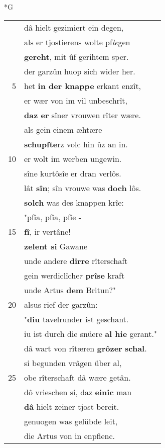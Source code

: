 \documentclass[8pt,a4paper,notitlepage]{article}
\begin{document}
\begin{table}[ht]
\begin{minipage}[t]{0.5\linewidth}
\small
\begin{center}*G
\end{center}
\begin{tabular}{rl}
 & dâ hielt gezimiert ein degen,\\ 
 & als er tjostierens wolte pf\textit{le}gen\\ 
 & \textbf{gereht}, mit ûf gerihtem sper.\\ 
 & der garzûn huop sich wider her.\\ 
5 & het \textbf{in der knappe} erkant enzît,\\ 
 & er wær von im vil unbeschrît,\\ 
 & \textbf{daz er} sîner vrouwen rîter wære.\\ 
 & als gein einem æhtære\\ 
 & \textbf{schupfte}rz volc hin ûz an in.\\ 
10 & er wolt im werben ungewin.\\ 
 & sîne kurtôsîe er dran verlôs.\\ 
 & lât \textbf{sîn}; sîn vrouwe was \textbf{doch} lôs.\\ 
 & \textbf{solch} was des knappen krîe:\\ 
 & "pfîa, pfîa, pfîe -\\ 
15 & \textbf{fî}, ir vertâne!\\ 
 & \textbf{zelent si} Gawane\\ 
 & unde andere \textbf{dirre} rîterschaft\\ 
 & gein werdiclîche\textit{r} \textbf{prîse} kraft\\ 
 & unde Artus \textbf{dem} Britun?"\\ 
20 & alsus rief der garzûn:\\ 
 & "\textbf{diu} tavelrunder ist geschant.\\ 
 & iu ist durch die snüere \textbf{al hie} gerant."\\ 
 & dâ wart von rîtæren \textbf{grôzer} \textbf{schal}.\\ 
 & si begunden vrâgen über al,\\ 
25 & obe rîterschaft dâ wære getân.\\ 
 & dô vrieschen si, daz \textbf{einic} man\\ 
 & \textbf{dâ} hielt zeiner tjost bereit.\\ 
 & genuogen was gelübde leit,\\ 
 & die Artus von in enpfienc.\\ 

\end{tabular}
\end{minipage}
\end{table}
\end{document}
